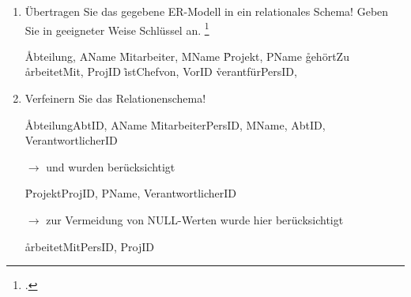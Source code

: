 \documentclass{bschlangaul-aufgabe}
\begin{document}
\begin{enumerate}


\item Übertragen Sie das gegebene ER-Modell in ein
relationales Schema! Geben Sie in geeigneter Weise Schlüssel an.
\footcite[Aufgabe 3: Relationenmodell Einstieg, Seite 2-3]{db:pu:1}

\begin{bAntwort}
\begin{bRelationenModell}
\r{Abteilung}{, AName}
\r{Mitarbeiter}{, MName}
\r{Projekt}{, PName}
\r{gehörtZu}{}
\r{arbeitetMit}{, ProjID}
\r{istChefvon}{, VorID}
\r{verantfür}{PersID, }
\end{bRelationenModell}
\end{bAntwort}


\item Verfeinern Sie das Relationenschema!

\begin{bAntwort}
\begin{bRelationenModell}
\r{Abteilung}{AbtID, AName}
\r{Mitarbeiter}{PersID, MName, AbtID, VerantwortlicherID}
\end{bRelationenModell}

$\rightarrow$  und  wurden
berücksichtigt

\begin{bRelationenModell}
\r{Projekt}{ProjID, PName, VerantwortlicherID}
\end{bRelationenModell}

$\rightarrow$ zur Vermeidung von NULL-Werten wurde hier
 berücksichtigt

\begin{bRelationenModell}
\r{arbeitetMit}{PersID, ProjID}
\end{bRelationenModell}
\end{bAntwort}
\end{enumerate}
\end{document}
